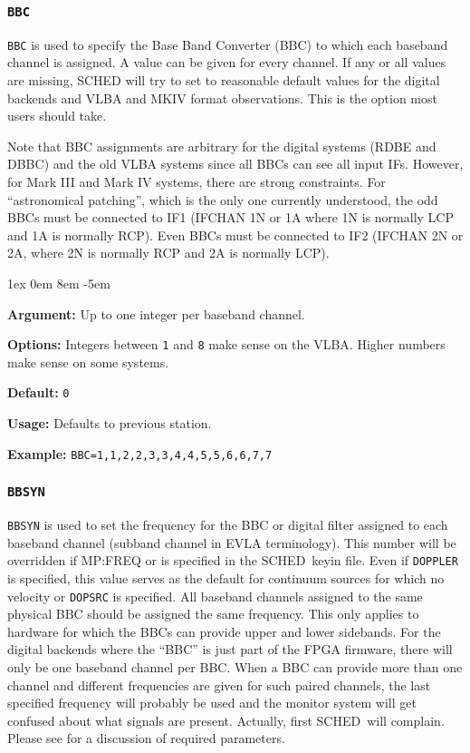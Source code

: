 \documentclass{report}
\newcommand{\schedb}{{\sc SCHED~}}
\newcommand{\rcwbox}[5]{
  \begin{list}{}{\parsep 1ex  \itemsep 0em
                 \leftmargin 8em  \itemindent -5em }
    \item {\bf Argument:} #1
    \item {\bf Options:}  #2
    \item {\bf Default:}  #3
    \item {\bf Usage:}    #4
    \item {\bf Example:}  #5
  \end{list}
}
\begin{document}
\subsubsection{\label{SP:BBC}{\tt BBC}}

{\tt BBC} is used to specify the Base Band Converter (BBC) to
which each baseband channel is assigned.  A value can be given
for every channel.  If any or all values are missing, SCHED will
try to set to reasonable default values for the digital backends
and VLBA and MKIV format observations.  This is the option most
users should take.

Note that BBC assignments are arbitrary for the digital systems (RDBE
and DBBC) and the old VLBA systems since all BBCs can see all input
IFs.  However, for Mark III and Mark IV systems, there are strong
constraints.  For ``astronomical patching'', which is the only one
currently understood, the odd BBCs must be connected to IF1 (IFCHAN 1N
or 1A where 1N is normally LCP and 1A is normally RCP).  Even BBCs
must be connected to IF2 (IFCHAN 2N or 2A, where 2N is normally RCP
and 2A is normally LCP).

\rcwbox
{Up to one integer per baseband channel.}
{Integers between {\tt 1} and {\tt 8} make sense on the VLBA.  Higher
numbers make sense on some systems.}
{{\tt 0}}
{Defaults to previous station.}
{{\tt BBC=1,1,2,2,3,3,4,4,5,5,6,6,7,7}}


\subsubsection{\label{SP:BBSYN}{\tt BBSYN}}

{\tt BBSYN} is used to set the frequency for the BBC or digital filter
assigned to each baseband channel (subband channel in EVLA
terminology). This number will be overridden if 
{MP:FREQ} or  is specified in the
\schedb keyin file. Even if {\tt DOPPLER} is specified, this value
serves as the default for continuum sources for which no velocity or
{\tt DOPSRC} is specified. All baseband channels assigned to the same
physical BBC should be assigned the same frequency.  This only applies
to hardware for which the BBCs can provide upper and lower sidebands.
For the digital backends where the ``BBC'' is just part of the FPGA
firmware, there will only be one baseband channel per BBC.  When a BBC
can provide more than one channel and different frequencies are given
for such paired channels, the last specified frequency will probably
be used and the monitor system will get confused about what signals
are present. Actually, first \schedb will complain.  Please see
 for a discussion of required
parameters.
\end{document}
